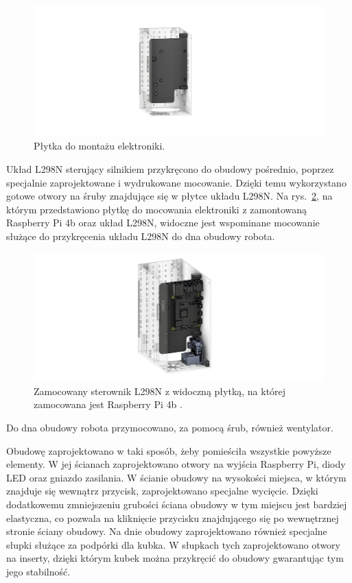 \begin{figure}[H]
    \centering
    \includegraphics[width=0.95\linewidth]{chapters/03-praca-wlasna/figures/main_board}
    \caption{\label{fig:mainboard}Płytka do montażu elektroniki.}
\end{figure}

Układ L298N sterujący silnikiem przykręcono do obudowy pośrednio, poprzez specjalnie zaprojektowane i wydrukowane mocowanie. Dzięki temu wykorzystano
gotowe otwory na śruby znajdujące się w płytce układu L298N. Na rys.~\ref{fig:steownik}, na którym przedstawiono płytkę do mocowania elektroniki
z zamontowaną Raspberry Pi 4b oraz układ L298N, widoczne jest wspominane mocowanie służące do przykręcenia układu L298N do dna obudowy robota.

\begin{figure}[H]
    \centering
    \includegraphics[width=0.95\linewidth]{chapters/03-praca-wlasna/figures/l298n}
    \caption{\label{fig:steownik}Zamocowany sterownik L298N \cite{L298n3d} z widoczną płytką, na której zamocowana jest Raspberry Pi 4b \cite{malina3d}.}
\end{figure}

Do dna obudowy robota przymocowano, za pomocą śrub, również wentylator.

Obudowę zaprojektowano w taki sposób, żeby pomieściła wszystkie powyższe elementy. W jej ścianach zaprojektowano otwory na wyjścia Raspberry Pi,
diody LED oraz gniazdo zasilania. W ścianie obudowy na wysokości miejsca, w którym znajduje się wewnątrz przycisk, zaprojektowano specjalne wycięcie.
Dzięki dodatkowemu zmniejszeniu grubości ściana obudowy w tym miejscu jest bardziej elastyczna, co pozwala na kliknięcie przycisku znajdującego
się po wewnętrznej stronie ściany obudowy. Na dnie obudowy zaprojektowano również specjalne słupki służące za podpórki dla kubka.
W słupkach tych zaprojektowano otwory na inserty, dzięki którym kubek można przykręcić do obudowy gwarantując tym jego stabilność.

